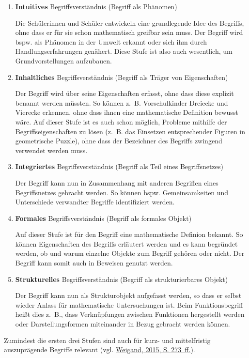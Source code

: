 \documentclass[
  ngerman,
]{scrbook}
\theoremstyle{definition}
\theoremstyle{definition}
\theoremstyle{definition}
\theoremstyle{definition}
\theoremstyle{remark}
\begin{document}
\begin{enumerate}
\def\labelenumi{\arabic{enumi}.}
\item
  \textbf{Intuitives} Begriffsverständnis (Begriff als Phänomen)

  Die Schülerinnen und Schüler entwickeln eine grundlegende Idee des Begriffs, ohne dass er für sie schon mathematisch greifbar sein muss. Der Begriff wird bspw. als Phänomen in der Umwelt erkannt oder sich ihm durch Handlungserfahrungen genähert. Diese Stufe ist also auch wesentlich, um Grundvorstellungen aufzubauen.
\item
  \textbf{Inhaltliches} Begriffsverständnis (Begriff als Träger von Eigenschaften)

  Der Begriff wird über seine Eigenschaften erfasst, ohne dass diese explizit benannt werden müssten. So können z.~B. Vorschulkinder Dreiecke und Vierecke erkennen, ohne dass ihnen eine mathematische Definition bewusst wäre. Auf dieser Stufe ist es auch schon möglich, Probleme mithilfe der Begriffseigenschaften zu lösen (z.~B. das Einsetzen entsprechender Figuren in geometrische Puzzle), ohne dass der Bezeichner des Begriffs zwingend verwendet werden muss.
\item
  \textbf{Integriertes} Begriffsverständnis (Begriff als Teil eines Begriffsnetzes)

  Der Begriff kann nun in Zusammenhang mit anderen Begriffen eines Begriffsnetzes gebracht werden. So können bspw. Gemeinsamkeiten und Unterschiede verwandter Begriffe identifiziert werden.
\item
  \textbf{Formales} Begriffsverständnis (Begriff als formales Objekt)

  Auf dieser Stufe ist für den Begriff eine mathematische Definion bekannt. So können Eigenschaften des Begriffs erläutert werden und es kann begründet werden, ob und warum einzelne Objekte zum Begriff gehören oder nicht. Der Begriff kann somit auch in Beweisen genutzt werden.
\item
  \textbf{Strukturelles} Begriffsverständnis (Begriff als strukturierbares Objekt)

  Der Begriff kann nun als Strukturobjekt aufgefasst werden, so dass er selbst wieder Anlass für mathematische Untersuchungen ist. Beim Funktionsbegriff heißt dies z.~B., dass Verknüpfungen zwischen Funktionen hergestellt werden oder Darstellungsformen miteinander in Bezug gebracht werden können.
\end{enumerate}

Zumindest die ersten drei Stufen sind auch für kurz- und mittelfristig auszuprägende Begriffe relevant (vgl. \protect\hyperlink{ref-Weigand2015}{Weigand, 2015, S. 273~ff.}).
\end{document}
